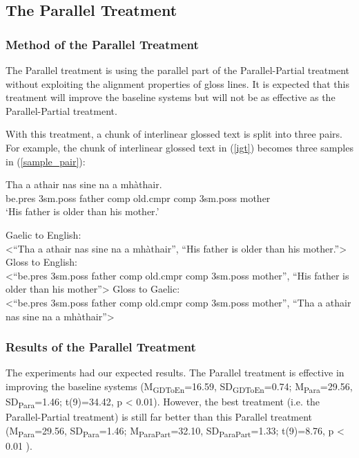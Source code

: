 \documentclass[11pt,a4paper]{article}
\begin{document}
\subsection{The Parallel Treatment}\label{treatment:Para}
\subsubsection{Method of the Parallel Treatment}
The Parallel treatment is using the parallel part of the Parallel-Partial treatment without exploiting the alignment properties of gloss lines.
It is expected that this treatment will improve the baseline systems but will not be as effective as the Parallel-Partial treatment.

With this treatment, a chunk of interlinear glossed text is split into three pairs. For example, the chunk of interlinear glossed text in (\ref{igt}) becomes three samples in (\ref{sample_pair}): 
\begin{exe} 
\ex \label{igt}
	\gll    Tha a athair nas sine na a mh\`athair.\\  
            be.pres 3sm.poss father comp old.cmpr comp 3sm.poss mother \\
    \glt    `His father is older than his mother.'  
\end{exe}


\begin{exe} 
	\ex \label{sample_pair}
	\begin{xlist}
		\ex Gaelic to English: \\<``Tha a athair nas sine na a mh\`athair'', ``His father is older than his mother.''>
		\ex Gloss to English: \\<``be.pres 3sm.poss father comp old.cmpr comp 3sm.poss mother'', ``His father is older than his mother''>
		\ex Gloss to Gaelic: \\<``be.pres 3sm.poss father comp old.cmpr comp 3sm.poss mother'', ``Tha a athair nas sine na a mh\`athair''>
	\end{xlist}
\end{exe}

\subsubsection{Results of the Parallel Treatment}\label{treatment:Para_result}
The experiments had our expected results.  
The Parallel treatment is effective in improving the baseline systems (M\textsubscript{GDToEn}=16.59, SD\textsubscript{GDToEn}=0.74; M\textsubscript{Para}=29.56, SD\textsubscript{Para}=1.46; t(9)=34.42, p < 0.01). 
However, the best treatment (i.e. the Parallel-Partial treatment) is still far better than this Parallel treatment 
(M\textsubscript{Para}=29.56, SD\textsubscript{Para}=1.46; M\textsubscript{ParaPart}=32.10, SD\textsubscript{ParaPart}=1.33; t(9)=8.76, p < 0.01 ).
\end{document}
